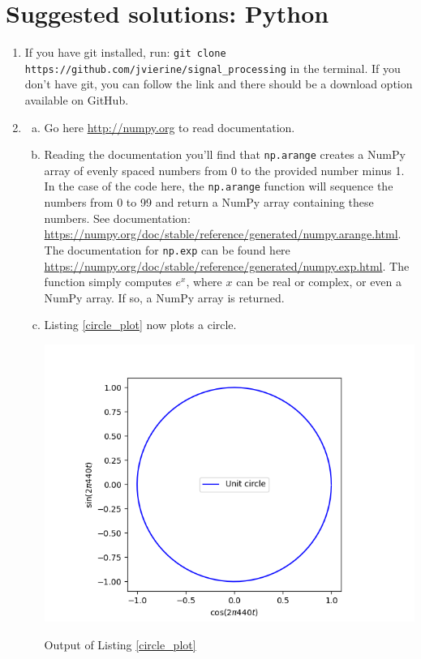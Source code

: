
\newpage
\section{Suggested solutions: Python}


\begin{enumerate}
  \item If you have git installed, run: \verb|git clone https://github.com/jvierine/signal_processing| in the terminal.
        If you don't have git, you can follow the link and there should be a download option available on GitHub.

  \item
    \begin{enumerate}[a)]
          \item Go here \url{http://numpy.org} to read documentation.
          \item Reading the documentation you'll find that \verb|np.arange| creates a NumPy array
                of evenly spaced numbers from 0 to the provided number minus 1. In the case of the code here,
                the \verb|np.arange| function will sequence the numbers from 0 to 99 and return a NumPy array containing these numbers.
                See documentation: \url{https://numpy.org/doc/stable/reference/generated/numpy.arange.html}.
                The documentation for \verb|np.exp| can be found here \url{https://numpy.org/doc/stable/reference/generated/numpy.exp.html}.
                The function simply computes $e^{x}$, where $x$ can be real or complex, or even a NumPy array. If so, a NumPy array is returned.
          \item Listing \ref{circle_plot} now plots a circle.
                

                \begin{marginfigure}
                  \includegraphics[width=\textwidth]{ch02/figures/circle_plot.png}
                  \caption{Output of Listing \ref{circle_plot}}
                \end{marginfigure}


\end{enumerate}
\end{enumerate}
